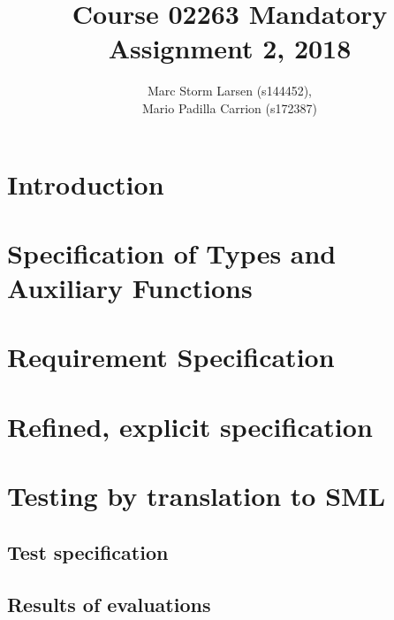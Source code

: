 \documentclass[a4]{article}
\title{Course 02263 Mandatory Assignment 2, 2018}
\author{Marc Storm Larsen (s144452),\\ 
        Mario Padilla Carrion (s172387)}
\begin{document}
\maketitle

\tableofcontents
\newpage

\section{Introduction}

\section{Specification of Types and Auxiliary Functions}

%  

\section{Requirement Specification}

%  

\section{Refined, explicit specification}

%  

\section{Testing by translation to SML}

\subsection{Test specification}

%

\subsection{Results of evaluations}
\end{document}
